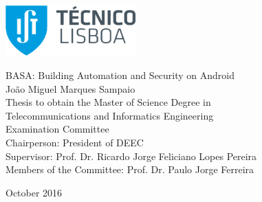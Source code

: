 \thispagestyle {empty}

\includegraphics[width=5.0cm]{Logo.png}

\begin{center}
%
\vspace{0.3cm}
 \vspace{5.0cm}

\vspace{0.8cm}
{\FontLb BASA: Building Automation and Security on Android} \\
\vspace{2.6cm}
{\FontMb João Miguel Marques Sampaio} \\
\vspace{1.9cm}
{\FontLn Thesis to obtain the Master of Science Degree in} \\
\vspace{0.3cm}
{\FontLb Telecommunications and Informatics Engineering} \\
\vspace{1.9cm}
{\FontMb Examination Committee} \\
\vspace{0.3cm}
{\FontSn %
Chairperson:        President of DEEC\\
Supervisor:        Prof. Dr. Ricardo Jorge Feliciano Lopes Pereira \\
Members of the Committee:  Prof. Dr. Paulo Jorge Ferreira \\
}
\vspace{1.5cm}

{\FontMb October 2016} \\
%
\end{center}

\cleardoublepage

\restoregeometry

